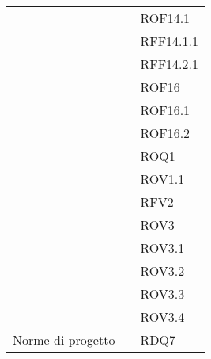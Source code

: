\begin{xltabular}{\textwidth}{ p{0.3\textwidth} | X | p{0.2\textwidth} }
    &&ROF14.1\\ 
    &&RFF14.1.1\\ 
    &&RFF14.2.1\\ 
    &&ROF16\\ 
    &&ROF16.1\\ 
    &&ROF16.2\\ 
    &&ROQ1\\ 
    &&ROV1.1\\ 
    &&RFV2\\ 
    &&ROV3\\ 
    &&ROV3.1\\ 
    &&ROV3.2\\ 
    &&ROV3.3\\ 
    &&ROV3.4\\ 


    Norme di progetto & & RDQ7\\



\end{xltabular}
